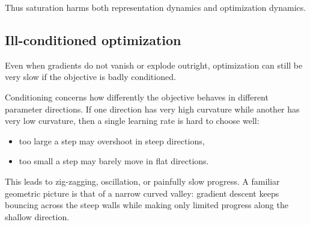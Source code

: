 \medskip

Thus saturation harms both representation dynamics and optimization dynamics.

\subsection*{Ill-conditioned optimization}

Even when gradients do not vanish or explode outright, optimization can still be very slow if the objective is badly conditioned.

\medskip

Conditioning concerns how differently the objective behaves in different parameter directions.
If one direction has very high curvature while another has very low curvature, then a single learning rate is hard to choose well:
\begin{itemize}
    \item too large a step may overshoot in steep directions,
    \item too small a step may barely move in flat directions.
\end{itemize}

\medskip

This leads to zig-zagging, oscillation, or painfully slow progress.
A familiar geometric picture is that of a narrow curved valley:
gradient descent keeps bouncing across the steep walls while making only limited progress along the shallow direction.

